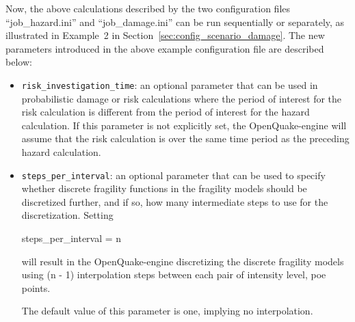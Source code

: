 Now, the above calculations described by the two configuration files
``job\_hazard.ini'' and ``job\_damage.ini'' can be run sequentially or
separately, as illustrated in Example~2 in
Section~\ref{sec:config_scenario_damage}. The new parameters introduced in the
above example configuration file are described below:

\begin{itemize}

  \item \Verb+risk_investigation_time+: an optional parameter that can be used
    in probabilistic damage or risk calculations where the period of interest
    for the risk calculation is different from the period of interest for the 
    hazard calculation. If this parameter is not explicitly set, the 
    OpenQuake-engine will assume that the risk calculation is over the same 
    time period as the preceding hazard calculation.

  \item \Verb+steps_per_interval+: an optional parameter that can be used to
    specify whether discrete fragility functions in the fragility models should
    be discretized further, and if so, how many intermediate steps to use for
    the discretization. Setting 

    steps\_per\_interval = n

    will result in the OpenQuake-engine discretizing the discrete fragility
    models using (n - 1) interpolation steps between each pair of 
    {intensity level, poe} points.

    The default value of this parameter is one, implying no interpolation.

\end{itemize}
